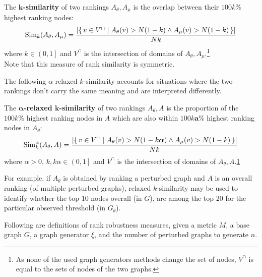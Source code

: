 \begin{savenotes}
    \begin{definition}[$\bm{k}$-similarity]
        \label{def:k_similarity}
        \vspace*{-2mm}
        The \textbf{$\bm{k}$-similarity} of two rankings $A_\theta, A_\mu$ is the overlap between their $100k\%$ highest ranking nodes:
        \[ \operatorname{Sim}_k(A_\theta, A_\mu) = \frac{\left\lvert \left\{\, v \in V^{\cap} \mid  A_\theta(v) > N(1-k) \wedge A_\mu(v) > N(1-k)  \, \right\} \right\rvert}{Nk} \]
        where $k \in \left( 0, 1 \right]$ and $V^{\cap}$ is the intersection of domains of $A_\theta, A_\mu$.\footnote{\label{foot:v_intersection_equal}As none of the used graph generators methods change the set of nodes, $V^{\cap}$ is equal to the sets of nodes of the two graphs.}\\
        Note that this measure of rank similarity is symmetric.
    \end{definition}
\end{savenotes}

The following $\alpha$-relaxed $k$-similarity accounts for situations where the two rankings don't carry the same meaning and are interpreted differently.

\begin{definition}
    \label{def:alpha_relaxed_k_similarity}
    \vspace*{-2mm}
    The \textbf{$\bm{\alpha}$-relaxed $\bm{k}$-similarity} of two rankings $A_\theta, A$ is the proportion of the $100k\%$ highest ranking nodes in $A$ which are also within $100k\bm{a}\%$ highest ranking nodes in $A_\theta$:
    \[ \operatorname{Sim}_k^\alpha(A_\theta, A) = \frac{\left\lvert \left\{\, v \in V^{\cap} \mid  A_\theta(v) > N(1-k\bm{\alpha}) \wedge A_\mu(v) > N(1-k)  \, \right\} \right\rvert}{Nk} \]
    where $\alpha > 0$, $k, k\alpha \in \left( 0, 1 \right]$ and $V^{\cap}$ is the intersection of domains of $A_\theta, A$.\cref{foot:v_intersection_equal}
\end{definition}

For example, if $A_\theta$ is obtained by ranking a perturbed graph and $A$ is an overall ranking (of multiple perturbed graphs), relaxed $k$-similarity may be used to identify whether the top 10 nodes overall (in $G$), are among the top 20 for the particular observed threshold (in $G_\theta$).

Following are definitions of rank robustness measures, given a metric $M$, a base graph $G$, a graph generator $\xi$, and the number of perturbed graphs to generate $n$.


